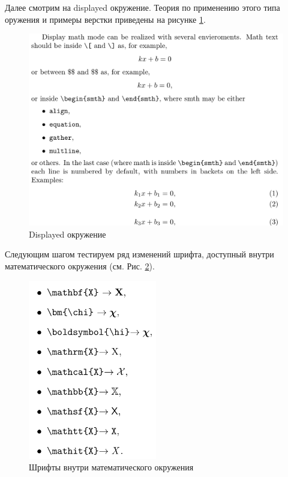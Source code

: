 \documentclass{article}
\begin{document}
Далее смотрим на displayed окружение. Теория по применению этого типа оружения и примеры верстки приведены на рисунке \ref{fig:displayed_math}.

  \begin{figure}[H]
    \centering
    \includegraphics[width=\textwidth]{images/displayed_math.png}
    \caption{Displayed окружение}
    \label{fig:displayed_math}
  \end{figure}

Следующим шагом тестируем ряд изменений шрифта, доступный внутри математического окружения (см. Рис. \ref{fig:math_fonts}).

\begin{figure}[H]
  \centering
  \includegraphics[width=0.5\textwidth]{images/math_fonts.png}
  \caption{Шрифты внутри математического окружения}
  \label{fig:math_fonts}
\end{figure}
\end{document}
